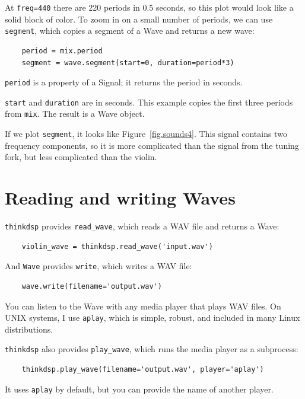 \documentclass[12pt]{book}
\begin{document}
At {\tt freq=440} there are 220 periods in 0.5 seconds, so this plot
would look like a solid block of color.  To zoom in on a small number
of periods, we can use {\tt segment}, which copies a segment of a Wave
and returns a new wave:

\begin{verbatim}
    period = mix.period
    segment = wave.segment(start=0, duration=period*3)
\end{verbatim}

{\tt period} is a property of a Signal; it returns the period in seconds.

{\tt start} and {\tt duration} are in seconds.  This example copies
the first three periods from {\tt mix}.  The result is a Wave object.

If we plot {\tt segment}, it looks like Figure~\ref{fig.sounds4}.
This signal contains two frequency components, so it is more
complicated than the signal from the tuning fork, but less complicated
than the violin.


\section{Reading and writing Waves}

{\tt thinkdsp} provides \verb"read_wave", which reads a WAV
file and returns a Wave:

\begin{verbatim}
    violin_wave = thinkdsp.read_wave('input.wav')
\end{verbatim}

And {\tt Wave} provides {\tt write}, which writes a WAV file:

\begin{verbatim}
    wave.write(filename='output.wav')
\end{verbatim}

You can listen to the Wave with any media player that plays WAV
files.  On UNIX systems, I use {\tt aplay}, which is simple, robust,
and included in many Linux distributions.

{\tt thinkdsp} also provides \verb"play_wave", which runs
the media player as a subprocess:

\begin{verbatim}
    thinkdsp.play_wave(filename='output.wav', player='aplay')
\end{verbatim}

It uses {\tt aplay} by default, but you can provide the
name of another player.
\end{document}
